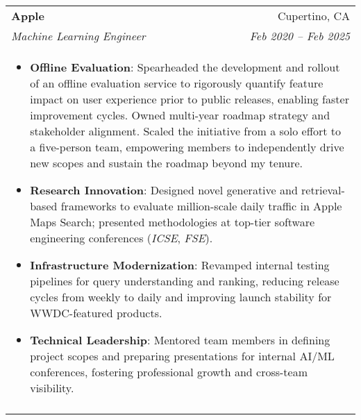 \documentclass[letterpaper,11pt]{article}
\begin{document}
\begin{tabular*}{0.97\textwidth}[t]{l@{\extracolsep{\fill}}r}
  \textbf{Apple} & Cupertino, CA \\
  \textit{\small Machine Learning Engineer} & \textit{\small Feb 2020 -- Feb 2025} \\
  \multicolumn{2}{l}{
    \begin{minipage}{\textwidth}
      \vspace{0.3em}
      \begin{itemize}[leftmargin=*, itemsep=-4.5pt, topsep=0pt, label={\raisebox{0.4ex}{\tiny\textbullet}}]       
        \item {\bf Offline Evaluation}: Spearheaded the development and rollout of an offline evaluation service to rigorously quantify feature impact on user experience prior to public releases, enabling faster improvement cycles. Owned multi-year roadmap strategy and stakeholder alignment. Scaled the initiative from a solo effort to a five-person team, empowering members to independently drive new scopes and sustain the roadmap beyond my tenure.
        \item {\bf Research Innovation}: Designed novel generative and retrieval-based frameworks to evaluate million-scale daily traffic in Apple Maps Search; presented methodologies at top-tier software engineering conferences ({\it ICSE}, {\it FSE}).
        \item {\bf Infrastructure Modernization}: Revamped internal testing pipelines for query understanding and ranking, reducing release cycles from weekly to daily and improving launch stability for WWDC-featured products.
        \item {\bf Technical Leadership}: Mentored team members in defining project scopes and preparing presentations for internal AI/ML conferences, fostering professional growth and cross-team visibility.
      \end{itemize}
    \end{minipage}
  } \\
  \noalign{\vspace{0.7em}}


\end{tabular*}
\end{document}

